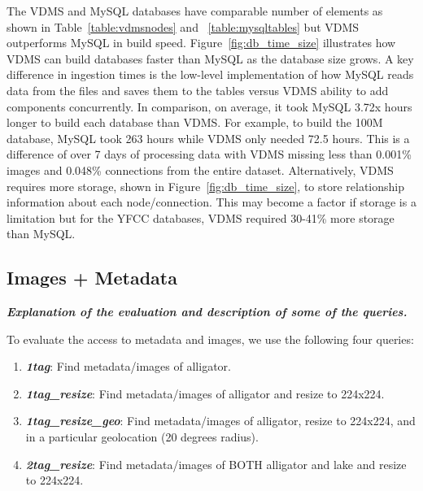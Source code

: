 The VDMS and MySQL databases have comparable number of elements as shown in Table~\ref{table:vdmsnodes} and ~\ref{table:mysqltables} but VDMS outperforms MySQL in build speed.  Figure~\ref{fig:db_time_size} illustrates how VDMS can build databases faster than MySQL as the database size grows.  A key difference in ingestion times is the low-level implementation of how MySQL reads data from the files and saves them to the tables versus VDMS ability to add components concurrently. In comparison, on average, it took MySQL 3.72x hours longer to build each database than VDMS. For example, to build the 100M database, MySQL took 263 hours while VDMS only needed 72.5 hours.  This is a difference of over 7 days of processing data with VDMS missing less than 0.001\% images and 0.048\% connections from the entire dataset.  Alternatively, VDMS requires more storage, shown in Figure~\ref{fig:db_time_size}, to store relationship information about each node/connection.  This may become a factor if storage is a limitation but for the YFCC databases, VDMS required 30-41\% more storage than MySQL.


\subsection{Images + Metadata}

\textbf{\textit{Explanation of the evaluation and description of some of the queries.}}

To evaluate the access to metadata and images, we use the following four queries:
\begin{enumerate}
\item {\bf {\em 1tag}}: Find metadata/images of alligator.
\item {\bf {\em 1tag\_resize}}: Find metadata/images of alligator and resize to 224x224.
\item {\bf {\em 1tag\_resize\_geo}}: Find metadata/images of alligator, resize to 224x224, and in a particular geolocation (20 degrees radius).
\item {\bf {\em 2tag\_resize}}: Find metadata/images of BOTH alligator and lake and resize to 224x224.
\end{enumerate}

